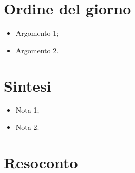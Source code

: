 \section{Ordine del giorno}
\begin{itemize}
    \item Argomento 1;
    \item Argomento 2.
\end{itemize}

\section{Sintesi}
\begin{itemize}
    \item Nota 1;
    \item Nota 2.
\end{itemize}

\section{Resoconto}
\lipsum[2-4]